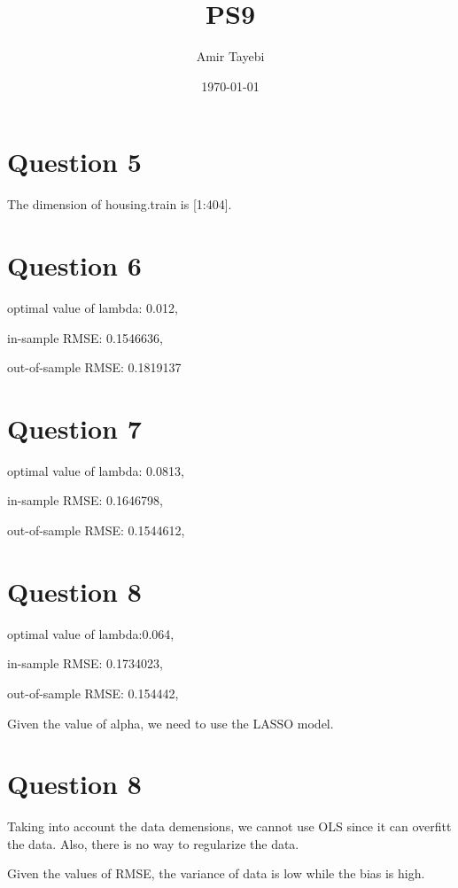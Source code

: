 \documentclass{article}
\title{PS9}
\author{Amir Tayebi}
\date{\today}
\begin{document}
\maketitle

\section*{Question 5}


\hspace{.5cm}The dimension of housing.train is [1:404].

\section*{Question 6}

\hspace{.5cm}optimal value of lambda: 0.012,

in-sample RMSE: 0.1546636,

out-of-sample RMSE: 0.1819137

\section*{Question 7}
\hspace{.5cm}optimal value of lambda: 0.0813,

in-sample RMSE: 0.1646798,

out-of-sample RMSE: 0.1544612,


\section*{Question 8}


\hspace{.5cm}optimal value of lambda:0.064,

in-sample RMSE: 0.1734023,

out-of-sample RMSE: 0.154442,


Given the value of alpha, we need to use the LASSO model.

\section*{Question 8}
\hspace{.5cm}Taking into account the data demensions, we cannot use OLS since it can overfitt the data. Also, there is no way to regularize the data.

Given the values of RMSE, the variance of data is low while the bias is high.
\end{document}
